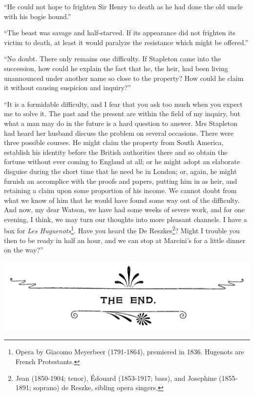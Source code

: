 \documentclass[paper=a5,BCOR=7mm,twoside,DIV=calc,12pt,usegeometry,openany,chapterprefix,endperiod,headings=big]{scrbook} %
\begin{document}
\enquote{He could not hope to frighten Sir Henry to death as he had done the old uncle with his bogie hound.}

\enquote{The beast was savage and half-starved. If its appearance did not frighten its victim to death, at least it would paralyze the resistance which might be offered.}

\enquote{No doubt. There only remains one difficulty. If Stapleton came into the succession, how could he explain the fact that he, the heir, had been living unannounced under another name so close to the property? How could he claim it without causing suspicion and inquiry?}

\enquote{It is a formidable difficulty, and I fear that you ask too much when you expect me to solve it. The past and the present are within the field of my inquiry, but what a man may do in the future is a hard question to answer. Mrs Stapleton had heard her husband discuss the problem on several occasions. There were three possible courses. He might claim the property from South America, establish his identity before the British authorities there and so obtain the fortune without ever coming to England at all; or he might adopt an elaborate disguise during the short time that he need be in London; or, again, he might furnish an accomplice with the proofs and papers, putting him in as heir, and retaining a claim upon some proportion of his income. We cannot doubt from what we know of him that he would have found some way out of the difficulty. And now, my dear Watson, we have had some weeks of severe work, and for one evening, I think, we may turn our thoughts into more pleasant channels. I have a box for \textit{Les Huguenots}\footnote{Opera by Giacomo Meyerbeer (1791-1864), premiered in 1836. Hugenots are French Protestants.}. Have you heard the De Reszkes\footnote{Jean (1850-1904; tenor), Édouard (1853-1917; bass), and Josephine (1855-1891; soprano) de Reszke, sibling opera singers.}? Might I trouble you then to be ready in half an hour, and we can stop at Marcini's for a little dinner on the way?}

\centering
\includegraphics[width=0.9\linewidth]{theend}
\end{document}

